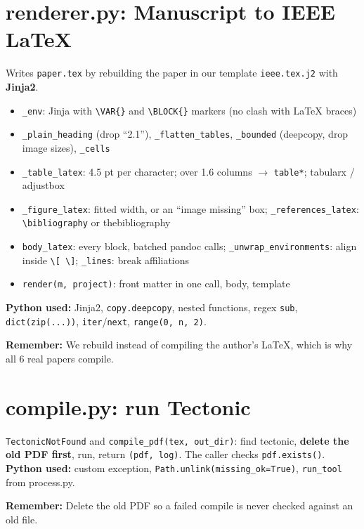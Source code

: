 \documentclass[10.5pt,a4paper]{article}
\newcommand{\cc}[1]{\texttt{#1}}
\newcommand{\remember}[1]{\par\smallskip\noindent\colorbox{soft}{\parbox{\dimexpr\linewidth-2\fboxsep}{\textbf{\color{slate}Remember:} #1}}\par\smallskip}
\begin{document}
\section{renderer.py: Manuscript to IEEE LaTeX}
Writes \cc{paper.tex} by rebuilding the paper in our template \cc{ieee.tex.j2} with \textbf{Jinja2}.
\begin{itemize}
\item \cc{\_env}: Jinja with \cc{\textbackslash VAR\{\}} and \cc{\textbackslash BLOCK\{\}} markers (no clash with LaTeX braces)
\item \cc{\_plain\_heading} (drop ``2.1''), \cc{\_flatten\_tables}, \cc{\_bounded} (deepcopy, drop image sizes), \cc{\_cells}
\item \cc{\_table\_latex}: 4.5 pt per character; over 1.6 columns \(\rightarrow\) \cc{table*}; tabularx / adjustbox
\item \cc{\_figure\_latex}: fitted width, or an ``image missing'' box; \cc{\_references\_latex}: \cc{\textbackslash bibliography} or thebibliography
\item \cc{body\_latex}: every block, batched pandoc calls; \cc{\_unwrap\_environments}: align inside \cc{\textbackslash[ \textbackslash]}; \cc{\_lines}: break affiliations
\item \cc{render(m, project)}: front matter in one call, body, template
\end{itemize}
\textbf{Python used:} Jinja2, \cc{copy.deepcopy}, nested functions, regex \cc{sub}, \cc{dict(zip(...))}, \cc{iter}/\cc{next}, \cc{range(0, n, 2)}.
\remember{We rebuild instead of compiling the author's LaTeX, which is why all 6 real papers compile.}

\section{compile.py: run Tectonic}
\cc{TectonicNotFound} and \cc{compile\_pdf(tex, out\_dir)}: find tectonic, \textbf{delete the old PDF first}, run, return \cc{(pdf, log)}. The caller checks \cc{pdf.exists()}.
\textbf{Python used:} custom exception, \cc{Path.unlink(missing\_ok=True)}, \cc{run\_tool} from process.py.
\remember{Delete the old PDF so a failed compile is never checked against an old file.}

\end{document}
